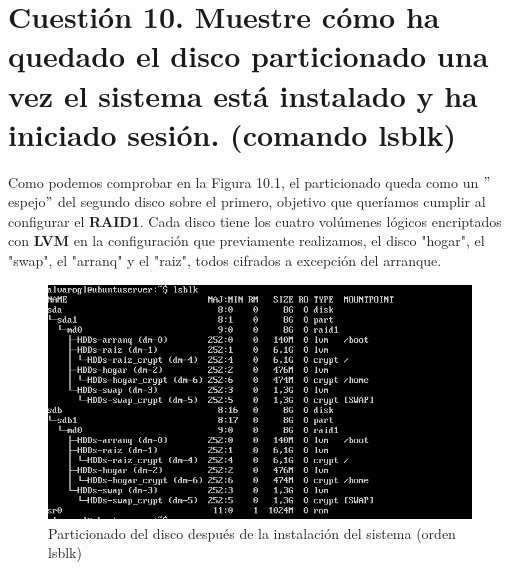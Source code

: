 

\section{Cuestión 10. Muestre cómo ha quedado el disco particionado una vez el sistema está instalado y ha iniciado sesión. (comando lsblk)}

Como podemos comprobar en la Figura 10.1, el particionado queda como un $"$espejo$"$ del segundo disco sobre el primero, objetivo que queríamos cumplir al configurar el \textbf{RAID1}. Cada disco tiene los cuatro volúmenes lógicos encriptados con \textbf{LVM} en la configuración que previamente realizamos, el disco "hogar", el "swap", el "arranq" y el "raiz", todos cifrados a excepción del arranque.

\begin{figure}[H] %
\centering
\includegraphics[scale=0.8]{cuestion10-lsblk.PNG}  %
\caption{Particionado del disco después de la instalación del sistema (orden lsblk)} \label{fig:figura1}
\end{figure}




